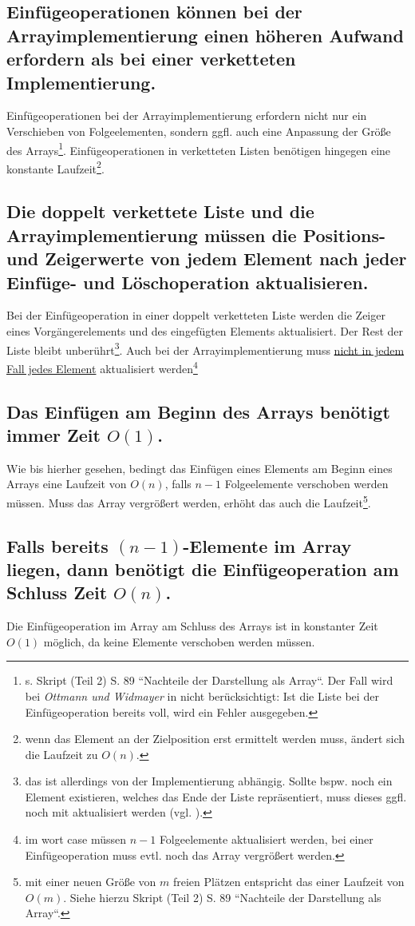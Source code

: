 \subsection*{Einfügeoperationen können bei der Arrayimplementierung einen höheren Aufwand erfordern als bei einer verketteten Implementierung.}
Einfügeoperationen bei der Arrayimplementierung erfordern nicht nur ein Verschieben von Folgeelementen, sondern {ggfl.} auch eine Anpassung der Größe des Arrays\footnote{
    s. Skript (Teil 2) S. 89 ``Nachteile der Darstellung als Array``. Der Fall wird bei \textit{Ottmann und Widmayer} in \cite[32]{OW17a} nicht berücksichtigt: Ist die Liste bei der Einfügeoperation bereits voll, wird ein Fehler ausgegeben.
}.
Einfügeoperationen in verketteten Listen benötigen hingegen eine konstante Laufzeit\footnote{
    wenn das Element an der Zielposition erst ermittelt werden muss, ändert sich die Laufzeit zu $O(n)$.
}.

\subsection*{Die doppelt verkettete Liste und die Arrayimplementierung müssen die Positions- und Zeigerwerte von jedem Element nach jeder Einfüge- und Löschoperation aktualisieren.}
Bei der Einfügeoperation in einer doppelt verketteten Liste werden die Zeiger eines Vorgängerelements und des eingefügten Elements aktualisiert.
Der Rest der Liste bleibt unberührt\footnote{
das ist allerdings von der Implementierung abhängig. Sollte bspw. noch ein Element existieren, welches das Ende der Liste repräsentiert, muss dieses ggfl. noch mit aktualisiert werden (vgl. \cite[35 ff.]{OW17a}).
}.
Auch bei der Arrayimplementierung muss \underline{nicht in jedem Fall jedes Element} aktualisiert werden\footnote{
im wort case müssen $n-1$ Folgeelemente aktualisiert werden, bei einer Einfügeoperation muss evtl. noch das Array vergrößert werden.
}


\subsection*{Das Einfügen am Beginn des Arrays benötigt immer Zeit $O(1)$.}
Wie bis hierher gesehen, bedingt das Einfügen eines Elements am Beginn eines Arrays eine Laufzeit von $O(n)$, falls $n-1$ Folgeelemente verschoben werden müssen.
Muss das Array vergrößert werden, erhöht das auch die Laufzeit\footnote{
    mit einer neuen Größe von $m$ freien Plätzen entspricht das einer Laufzeit von $O(m)$. Siehe hierzu Skript (Teil 2) S. 89 ``Nachteile der Darstellung als Array``.
}.

\subsection*{Falls bereits $(n-1)$-Elemente im Array liegen, dann benötigt die Einfügeoperation am Schluss Zeit $O(n)$.}
Die Einfügeoperation im Array am Schluss des Arrays ist in konstanter Zeit $O(1)$ möglich, da keine Elemente verschoben werden müssen.

